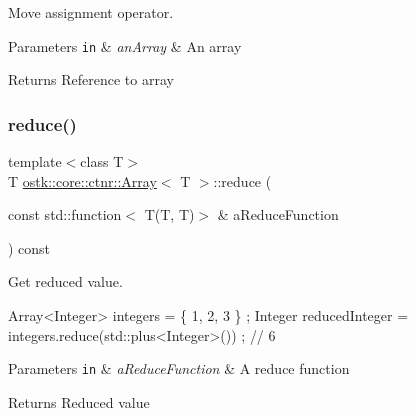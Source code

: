 Move assignment operator. 


\begin{DoxyParams}[1]{Parameters}
\mbox{\tt in}  & {\em an\+Array} & An array \\
\hline
\end{DoxyParams}
\begin{DoxyReturn}{Returns}
Reference to array 
\end{DoxyReturn}
\mbox{\label{classostk_1_1core_1_1ctnr_1_1_array_a26fb804388b4f3fad508fa1cd7867f52}} 
\subsubsection{\texorpdfstring{reduce()}{reduce()}}
{\footnotesize\ttfamily template$<$class T$>$ \\
T \hyperlink{classostk_1_1core_1_1ctnr_1_1_array}{ostk\+::core\+::ctnr\+::\+Array}$<$ T $>$\+::reduce (\begin{DoxyParamCaption}\item[{const std\+::function$<$ T(T, T)$>$ \&}]{a\+Reduce\+Function }\end{DoxyParamCaption}) const}



Get reduced value. 


\begin{DoxyCode}
Array<Integer> integers = \{ 1, 2, 3 \} ;
Integer reducedInteger = integers.reduce(std::plus<Integer>()) ; \textcolor{comment}{// 6}
\end{DoxyCode}



\begin{DoxyParams}[1]{Parameters}
\mbox{\tt in}  & {\em a\+Reduce\+Function} & A reduce function \\
\hline
\end{DoxyParams}
\begin{DoxyReturn}{Returns}
Reduced value 
\end{DoxyReturn}
\mbox{\label{classostk_1_1core_1_1ctnr_1_1_array_a181587d350f45e2438583234a73b03f5}} 
